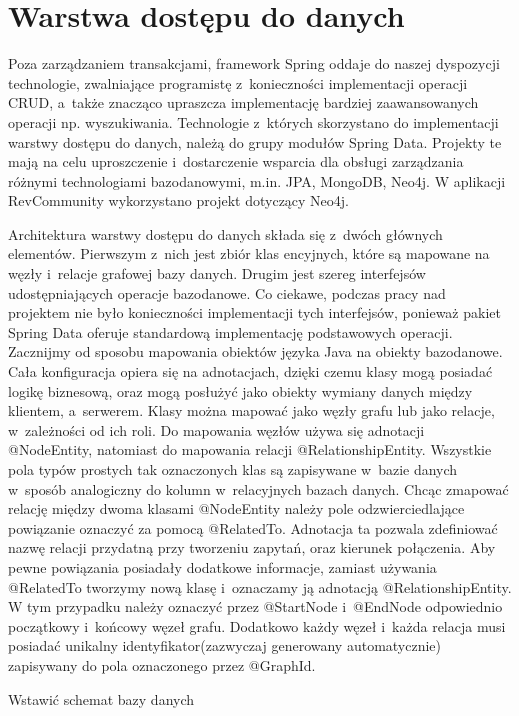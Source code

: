 \section{Warstwa dostępu do danych}

Poza zarządzaniem transakcjami, framework Spring oddaje do naszej dyspozycji technologie, zwalniające programistę z~konieczności implementacji operacji CRUD, a~także znacząco upraszcza implementację bardziej zaawansowanych operacji np. wyszukiwania. Technologie z~których skorzystano do implementacji warstwy dostępu do danych, należą do grupy modułów Spring Data. Projekty te mają na celu uproszczenie i~dostarczenie wsparcia dla obsługi zarządzania różnymi technologiami bazodanowymi, m.in. JPA, MongoDB, Neo4j. W aplikacji RevCommunity wykorzystano projekt dotyczący Neo4j.

Architektura warstwy dostępu do danych składa się z~dwóch głównych elementów. Pierwszym z~nich jest zbiór klas encyjnych, które są mapowane na węzły i~relacje grafowej bazy danych. Drugim jest szereg interfejsów udostępniających operacje bazodanowe. Co ciekawe, podczas pracy nad projektem nie było konieczności implementacji tych interfejsów, ponieważ pakiet Spring Data oferuje standardową implementację podstawowych operacji. Zacznijmy od sposobu mapowania obiektów języka Java na obiekty bazodanowe. Cała konfiguracja opiera się na adnotacjach, dzięki czemu klasy mogą posiadać logikę biznesową, oraz mogą posłużyć jako obiekty wymiany danych między klientem, a~serwerem. Klasy można mapować jako węzły grafu lub jako relacje, w~zależności od ich roli. Do mapowania węzłów używa się adnotacji @NodeEntity, natomiast do mapowania relacji @RelationshipEntity. Wszystkie pola typów prostych tak oznaczonych klas są zapisywane w~bazie danych w~sposób analogiczny do kolumn w~relacyjnych bazach danych. Chcąc zmapować relację między dwoma klasami @NodeEntity należy pole odzwierciedlające powiązanie oznaczyć za pomocą @RelatedTo. Adnotacja ta pozwala zdefiniować nazwę relacji przydatną przy tworzeniu zapytań, oraz kierunek połączenia. Aby pewne powiązania posiadały dodatkowe informacje, zamiast używania @RelatedTo tworzymy nową klasę i~oznaczamy ją adnotacją @RelationshipEntity. W tym przypadku należy oznaczyć przez @StartNode i~@EndNode odpowiednio początkowy i~końcowy węzeł grafu. Dodatkowo każdy węzeł i~każda relacja musi posiadać unikalny identyfikator(zazwyczaj generowany automatycznie) zapisywany do pola oznaczonego przez @GraphId. 

Wstawić schemat bazy danych

